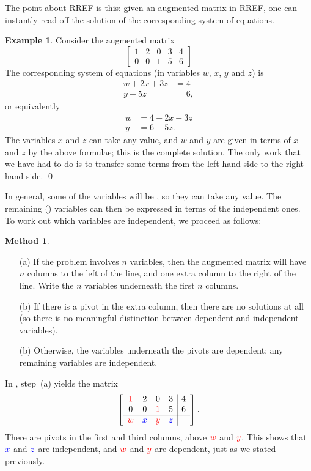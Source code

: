 \documentclass[a4paper]{book}
\theoremstyle{definition}
\newtheorem{example}[theorem]{Example}
\newtheorem{method}[theorem]{Method}
\begin{document}
The point about RREF is this: given an augmented matrix in RREF, one
can instantly read off the solution of the corresponding system of
equations. 
\begin{example}
 Consider the augmented matrix
 \[ \left[\begin{array}{cccc|c}
     1 & 2 & 0 & 3 & 4 \\ 
     0 & 0 & 1 & 5 & 6 
    \end{array}\right]
 \] 
 The corresponding system of equations (in variables $w$, $x$, $y$ and
 $z$) is
 \begin{align*}
  w + 2x + 3z &= 4 \\
         y+5z &= 6,
 \end{align*}
 or equivalently
 \begin{align*}
  w &= 4 - 2x - 3z \\
  y &= 6-5z.
 \end{align*}
 The variables $x$ and $z$ can take any value, and $w$ and $y$ are
 given in terms of $x$ and $z$ by the above formulae; this is the
 complete solution.  The only work that we have had to do is to
 transfer some terms from the left hand side to the right hand side.
 \qed
\end{example}
In general, some of the variables will be , so they
can take any value.  The remaining () variables can
then be expressed in terms of the independent ones.  To work out which
variables are independent, we proceed as follows:
\begin{method}
 \begin{itemize}
  \item[(a)] If the problem involves $n$ variables, then the augmented
   matrix will have $n$ columns to the left of the line, and one extra
   column to the right of the line.  Write the $n$ variables underneath
   the first $n$ columns.
  \item[(b)] If there is a pivot in the extra column, then there are no
   solutions at all (so there is no meaningful distinction between
   dependent and independent variables).
  \item[(b)] Otherwise, the variables underneath the pivots are
   dependent; any remaining variables are independent. 
 \end{itemize}
\end{method}
In , step~(a) yields the matrix
\[  \left[\begin{array}{cccc|c}
     {\color{red}1} & 2        &      0  & 3 & 4 \\ 
     0       & 0        & {\color{red}1} & 5 & 6 \\ \hline
     {\color{red}w} & {\color{blue}x} & {\color{red}y} & {\color{blue}z} &
    \end{array}\right].
\]
There are pivots in the first and third columns, above ${\color{red}w}$ and
${\color{red}y}$.  This shows that ${\color{blue}x}$ and ${\color{blue}z}$ are independent,
and ${\color{red}w}$ and ${\color{red}y}$ are dependent, just as we stated
previously.  
\end{document}

